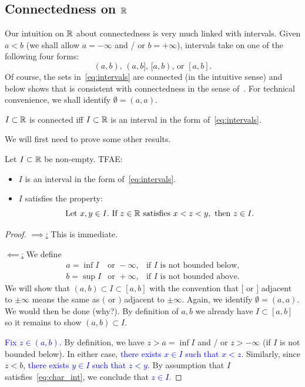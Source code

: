 \subsection{Connectedness on $\mathbb{R}$}
\label{sec:connect_R}
Our intuition on $\mathbb{R}$ about connectedness is very much linked with intervals. Given $a<b$ (we shall allow $a = -\infty$ and / or $b = +\infty$), intervals take on one of the following four forms:
\begin{equation}
	\label{eq:intervals}
	(a,b),\,(a,b],\,[a,b),\,\text{or }[a,b].
\end{equation}
Of course, the sets in~\eqref{eq:intervals} are connected (in the intuitive sense) and~ below shows that is consistent with connectedness in the sense of~. For technical convenience, we shall identify $\emptyset = (a,a)$.
\begin{thm}
	\label{thm:connected_interval}
	$I \subset \mathbb{R}$ is connected iff $I\subset \mathbb{R}$ is an interval in the form of~\eqref{eq:intervals}.
\end{thm}
We will first need to prove some other results.
\begin{prop}
	\label{prop:char_int}
	Let $I\subset \mathbb{R}$ be non-empty. TFAE:
	\begin{itemize}
		\item $I$ is an interval in the form of~\eqref{eq:intervals}.
		\item $I$ satisfies the property:
		\begin{equation}
			\label{eq:char_int}
			\text{Let }x,y\in I.\text{ If }z\in \mathbb{R}\text{ satisfies }x < z < y,\text{ then }z \in I.
		\end{equation}
	\end{itemize}
\end{prop}
\begin{proof}
	\ul{$\implies$:} This is immediate.
	
	\ul{$\impliedby$:} We define
	\[
	\begin{array}{ccc}
		a = \inf I 	&\text{or }-\infty, 	&\text{if $I$ is not bounded below,} 	\\
		b = \sup I &\text{or }+\infty, 	&\text{if $I$ is not bounded above.}
	\end{array}
	\]
	We will show that $(a,b)\subset I \subset [a,b]$ with the convention that $[$ or $]$ adjacent to $\pm \infty$ means the same as $($ or $)$ adjacent to $\pm \infty$. Again, we identify $\emptyset = (a,a)$. We would then be done (why?). By definition of $a,b$ we already have $I\subset [a,b]$ so it remains to show $(a,b) \subset I$.
	
	\textcolor{blue}{Fix $z \in (a,b)$.} By definition, we have $z> a = \inf I$ and / or $z >-\infty$ (if $I$ is not bounded below). In either case, \textcolor{blue}{there exists $x \in I$ such that $x<z$.} Similarly, since $z < b$, \textcolor{blue}{there exists $y\in I$ such that $z < y$.} By assumption that $I$ satisfies~\eqref{eq:char_int}, we conclude that \textcolor{blue}{$z \in I$.}
\end{proof}
